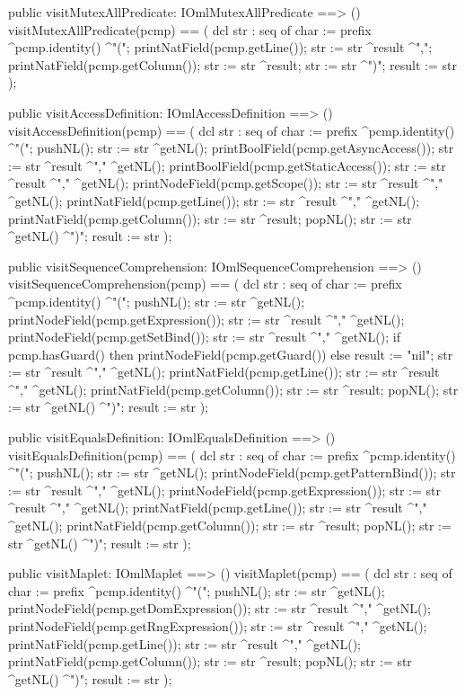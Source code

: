 \begin{vdm_al}
  public visitMutexAllPredicate: IOmlMutexAllPredicate ==> ()
  visitMutexAllPredicate(pcmp) ==
    ( dcl str : seq of char := prefix ^pcmp.identity() ^"(";
      printNatField(pcmp.getLine());
      str := str ^result ^",";
      printNatField(pcmp.getColumn());
      str := str ^result;
      str := str ^")";
      result := str );

  public visitAccessDefinition: IOmlAccessDefinition ==> ()
  visitAccessDefinition(pcmp) ==
    ( dcl str : seq of char := prefix ^pcmp.identity() ^"(";
      pushNL();
      str := str ^getNL();
      printBoolField(pcmp.getAsyncAccess());
      str := str ^result ^"," ^getNL();
      printBoolField(pcmp.getStaticAccess());
      str := str ^result ^"," ^getNL();
      printNodeField(pcmp.getScope());
      str := str ^result ^"," ^getNL();
      printNatField(pcmp.getLine());
      str := str ^result ^"," ^getNL();
      printNatField(pcmp.getColumn());
      str := str ^result;
      popNL();
      str := str ^getNL() ^")";
      result := str );

  public visitSequenceComprehension: IOmlSequenceComprehension ==> ()
  visitSequenceComprehension(pcmp) ==
    ( dcl str : seq of char := prefix ^pcmp.identity() ^"(";
      pushNL();
      str := str ^getNL();
      printNodeField(pcmp.getExpression());
      str := str ^result ^"," ^getNL();
      printNodeField(pcmp.getSetBind());
      str := str ^result ^"," ^getNL();
      if pcmp.hasGuard()
      then printNodeField(pcmp.getGuard())
      else result := "nil";
      str := str ^result ^"," ^getNL();
      printNatField(pcmp.getLine());
      str := str ^result ^"," ^getNL();
      printNatField(pcmp.getColumn());
      str := str ^result;
      popNL();
      str := str ^getNL() ^")";
      result := str );

  public visitEqualsDefinition: IOmlEqualsDefinition ==> ()
  visitEqualsDefinition(pcmp) ==
    ( dcl str : seq of char := prefix ^pcmp.identity() ^"(";
      pushNL();
      str := str ^getNL();
      printNodeField(pcmp.getPatternBind());
      str := str ^result ^"," ^getNL();
      printNodeField(pcmp.getExpression());
      str := str ^result ^"," ^getNL();
      printNatField(pcmp.getLine());
      str := str ^result ^"," ^getNL();
      printNatField(pcmp.getColumn());
      str := str ^result;
      popNL();
      str := str ^getNL() ^")";
      result := str );

  public visitMaplet: IOmlMaplet ==> ()
  visitMaplet(pcmp) ==
    ( dcl str : seq of char := prefix ^pcmp.identity() ^"(";
      pushNL();
      str := str ^getNL();
      printNodeField(pcmp.getDomExpression());
      str := str ^result ^"," ^getNL();
      printNodeField(pcmp.getRngExpression());
      str := str ^result ^"," ^getNL();
      printNatField(pcmp.getLine());
      str := str ^result ^"," ^getNL();
      printNatField(pcmp.getColumn());
      str := str ^result;
      popNL();
      str := str ^getNL() ^")";
      result := str );


\end{vdm_al}
